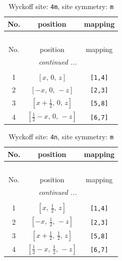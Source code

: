 \documentclass[fleqn,8pt]{jsarticle}
\begin{document}
\renewcommand{\arraystretch}{1.2}
\begin{longtable}{ccc}
\caption{Wyckoff site: {\tt 4m}, site symmetry: {\tt m}}
 \\
 \hline \hline
No. & position & mapping \\ \hline \endfirsthead

\multicolumn{2}{l}{\tablename\ \thetable{}} \\
 \hline \hline
No. & position & mapping \\ \hline \endhead

 \hline \hline
\multicolumn{2}{r}{\footnotesize\it continued ...} \\ \endfoot

 \hline \hline
\multicolumn{2}{r}{} \\ \endlastfoot

1 & $\left[ x,\, 0,\, z \right]$ & {\tt [1,4]} \\ \hline
2 & $\left[ - x,\, 0,\, - z \right]$ & {\tt [2,3]} \\ \hline
3 & $\left[ x + \frac{1}{2},\, 0,\, z \right]$ & {\tt [5,8]} \\ \hline
4 & $\left[ \frac{1}{2} - x,\, 0,\, - z \right]$ & {\tt [6,7]} \\
\end{longtable}
\renewcommand{\arraystretch}{1.2}
\begin{longtable}{ccc}
\caption{Wyckoff site: {\tt 4n}, site symmetry: {\tt m}}
 \\
 \hline \hline
No. & position & mapping \\ \hline \endfirsthead

\multicolumn{2}{l}{\tablename\ \thetable{}} \\
 \hline \hline
No. & position & mapping \\ \hline \endhead

 \hline \hline
\multicolumn{2}{r}{\footnotesize\it continued ...} \\ \endfoot

 \hline \hline
\multicolumn{2}{r}{} \\ \endlastfoot

1 & $\left[ x,\, \frac{1}{2},\, z \right]$ & {\tt [1,4]} \\ \hline
2 & $\left[ - x,\, \frac{1}{2},\, - z \right]$ & {\tt [2,3]} \\ \hline
3 & $\left[ x + \frac{1}{2},\, \frac{1}{2},\, z \right]$ & {\tt [5,8]} \\ \hline
4 & $\left[ \frac{1}{2} - x,\, \frac{1}{2},\, - z \right]$ & {\tt [6,7]} \\
\end{longtable}
\end{document}
